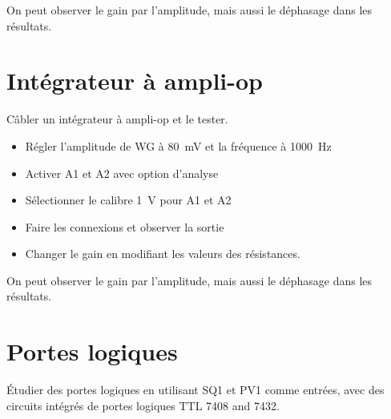 \documentclass[a4paper,12pt,french]{sphinxmanual}
\let\sphinxpxdimen\pdfpxdimen\else\newdimen\sphinxpxdimen
\begin{document}

On peut observer le gain par l’amplitude, mais aussi le déphasage dans
les résultats.


\section{Intégrateur à ampli-op}
\label{\detokenize{3.10:integrateur-a-ampli-op}}\label{\detokenize{3.10::doc}}

Câbler un intégrateur à ampli-op et le tester.

\noindent\sphinxincludegraphics[width=300\sphinxpxdimen]{{opamp-int}.pdf}

\begin{itemize}
\item {} 
Régler l’amplitude de WG à 80 mV et la fréquence à 1000 Hz

\item {} 
Activer A1 et A2 avec option d’analyse

\item {} 
Sélectionner le calibre 1 V pour A1 et A2

\item {} 
Faire les connexions et observer la sortie

\item {} 
Changer le gain en modifiant les valeurs des résistances.

\end{itemize}


On peut observer le gain par l’amplitude, mais aussi le déphasage dans
les résultats.


\section{Portes logiques}
\label{\detokenize{3.11:portes-logiques}}\label{\detokenize{3.11::doc}}

Étudier des portes logiques en utilisant SQ1 et PV1 comme entrées, avec
des circuits intégrés de portes logiques TTL 7408 and 7432.

\end{document}
